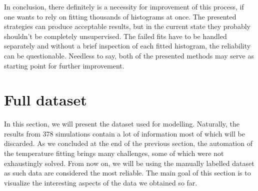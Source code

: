 In conclusion, there definitely is a necessity for improvement of this process, if one wants to rely on fitting thousands of histograms at once. The presented strategies can produce acceptable results, but in the current state they probably shouldn't be completely unsupervised. The failed fits have to be handled separately and without a brief inspection of each fitted histogram, the reliability can be questionable. Needless to say, both of the presented methods may serve as starting point for further improvement.

\newpage
\section{Full dataset}
In this section, we will present the dataset used for modelling. Naturally, the results from 378 simulations contain a lot of information most of which will be discarded. As we concluded at the end of the previous section, the automation of the temperature fitting brings many challenges, some of which were not exhaustingly solved. From now on, we will be using the manually labelled dataset as such data are considered the most reliable. The main goal of this section is to visualize the interesting aspects of the data we obtained so far.
